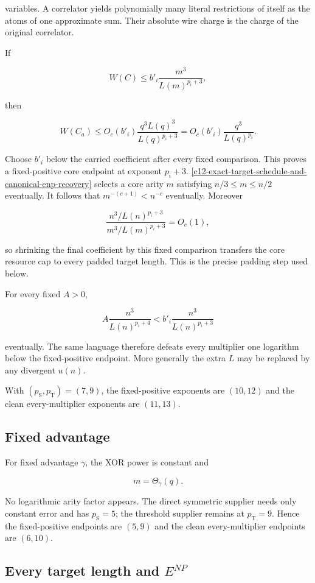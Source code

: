 \documentclass[11pt,letterpaper]{article}
\newcommand{\cref}[1]{\ref{#1}}
\theoremstyle{definition}
\theoremstyle{remark}
\begin{document}
variables. A correlator yields polynomially many literal restrictions of
itself as the atoms of one approximate sum. Their absolute wire charge
is the charge of the original correlator.

If

\[
W(C)\le b'_i\frac{m^3}{L(m)^{p_i+3}},
\]

then

\[
W(C_a)
\le
O_c(b'_i)
\frac{q^3L(q)^3}{L(q)^{p_i+3}}
{}={}
O_c(b'_i)
\frac{q^3}{L(q)^{p_i}}.
\]

Choose \(b'_i\) below the carried coefficient after every fixed
comparison. This proves a fixed-positive core endpoint at exponent
\(p_i+3\). \cref{c12-exact-target-schedule-and-canonical-enp-recovery} selects a core arity \(m\) satisfying
\(n/3\le m\le n/2\) eventually. It follows that \(m^{-(c+1)}<n^{-c}\)
eventually. Moreover

\[
\frac{n^3/L(n)^{p_i+3}}{m^3/L(m)^{p_i+3}}
=O_c(1),
\]

so shrinking the final coefficient by this fixed comparison transfers
the core resource cap to every padded target length. This is the precise
padding step used below.

For every fixed \(A>0\),

\[
A\frac{n^3}{L(n)^{p_i+4}}
{}<{}
b'_i\frac{n^3}{L(n)^{p_i+3}}
\]

eventually. The same language therefore defeats every multiplier one
logarithm below the fixed-positive endpoint. More generally the extra
\(L\) may be replaced by any divergent \(u(n)\).

With \((p_{\mathrm S},p_{\mathrm T})=(7,9)\), the fixed-positive
exponents are \((10,12)\) and the clean every-multiplier exponents are
\((11,13)\).

\subsection{Fixed advantage}\label{c6-fixed-advantage}

For fixed advantage \(\gamma\), the XOR power is constant and

\[
m=\Theta_\gamma(q).
\]

No logarithmic arity factor appears. The direct symmetric supplier needs
only constant error and has \(p_{\mathrm S}=5\); the threshold supplier
remains at \(p_{\mathrm T}=9\). Hence the fixed-positive endpoints are
\((5,9)\) and the clean every-multiplier endpoints are \((6,10)\).

\subsection{\texorpdfstring{Every target length and
\(E^{NP}\)}{Every target length and E\^{}\{NP\}}}\label{c7-every-target-length-and-enp}
\end{document}
